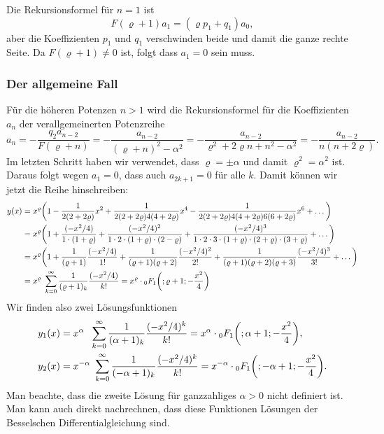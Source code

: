 Die Rekursionsformel für $n=1$ ist
\[
F(\varrho+1) a_1 = (\varrho p_1+q_1)a_0,
\]
aber die Koeffizienten $p_1$ und $q_1$ verschwinden beide und damit
die ganze rechte Seite.
Da $F(\varrho+1)\ne 0$ ist, folgt dass $a_1=0$ sein muss.


%
%
\subsubsection{Der allgemeine Fall}
Für die höheren Potenzen $n>1$ wird die Rekursionsformel für die
Koeffizienten $a_n$ der verallgemeinerten Potenzreihe
\[
a_{n} =
-\frac{ q_2 a_{n-2} }{F(\varrho+n)}
=
-\frac{a_{n-2}}{(\varrho+n)^2-\alpha^2}
=
-\frac{a_{n-2}}{\varrho^2 + 2\varrho n+n^2-\alpha^2}
=
-\frac{a_{n-2}}{n(n+2\varrho)}.
\]
Im letzten Schritt haben wir verwendet, dass $\varrho=\pm\alpha$
und damit $\varrho^2=\alpha^2$ ist.
Daraus folgt wegen $a_1=0$, dass auch $a_{2k+1}=0$ für alle $k$.
Damit können wir jetzt die Reihe hinschreiben:
\begin{align*}
y(x)
&=
x^{\varrho}\biggl(
1
-
\frac{1}{2(2+2\varrho)} x^2
+
\frac{1}{2(2+2\varrho)4(4+2\varrho)} x^4
-
\frac{1}{2(2+2\varrho)4(4+2\varrho)6(6+2\varrho)} x^6
+
\dots
\biggr)
\\
&=
x^{\varrho}
\biggl(
1
+
\frac{(-x^2/4)}{1\cdot (1+\varrho)}
+
\frac{(-x^2/4)^2}{1\cdot 2\cdot (1+\varrho)\cdot(2-\varrho)}
+
\frac{(-x^2/4)^3}{1\cdot 2\cdot 3\cdot (1+\varrho)\cdot(2+\varrho)\cdot(3+\varrho)}
+
\dots
\biggr)
\\
&=
x^\varrho\biggl(
1
+
\frac{1}{(\varrho+1)}\frac{(-x^2/4)}{1!}
+
\frac{1}{(\varrho+1)(\varrho+2)}\frac{(-x^2/4)^2}{2!}
+
\frac{1}{(\varrho+1)(\varrho+2)(\varrho+3)}\frac{(-x^2/4)^3}{3!}
+
\dots
\biggr)
\\
&=
x^\varrho \sum_{k=0}^\infty
\frac{1}{(\varrho+1)_k} \frac{(-x^2/4)}{k!}
=
x^\varrho
\cdot
\mathstrut_0F_1\biggl(;\varrho+1;-\frac{x^2}{4}\biggr)
\end{align*}
Wir finden also zwei Lösungsfunktionen
\begin{align}
y_1(x)
&=
x^{\alpha\phantom{-}}
\sum_{k=0}^\infty
\frac{1}{(\alpha+1)_k}
\frac{(-x^2/4)^k}{k!}
=
x^\alpha
\cdot
\mathstrut_0F_1\biggl(;\alpha+1;-\frac{x^2}{4}\biggr),
\label{buch:differentialgleichunge:bessel:eqn:erste}
\\
y_2(x)
&=
x^{-\alpha} \sum_{k=0}^\infty
\frac{1}{(-\alpha+1)_k} \frac{(-x^2/4)^k}{k!}
=
x^{-\alpha}
\cdot
\mathstrut_0F_1\biggl(;-\alpha+1;-\frac{x^2}{4}\biggr).
\label{buch:differentialgleichunge:bessel:eqn:zweite}
\end{align}
Man beachte, dass die zweite Lösung für ganzzahliges $\alpha>0$ nicht
definiert ist.
Man kann auch direkt nachrechnen, dass diese Funktionen Lösungen
der Besselschen Differentialgleichung sind.

